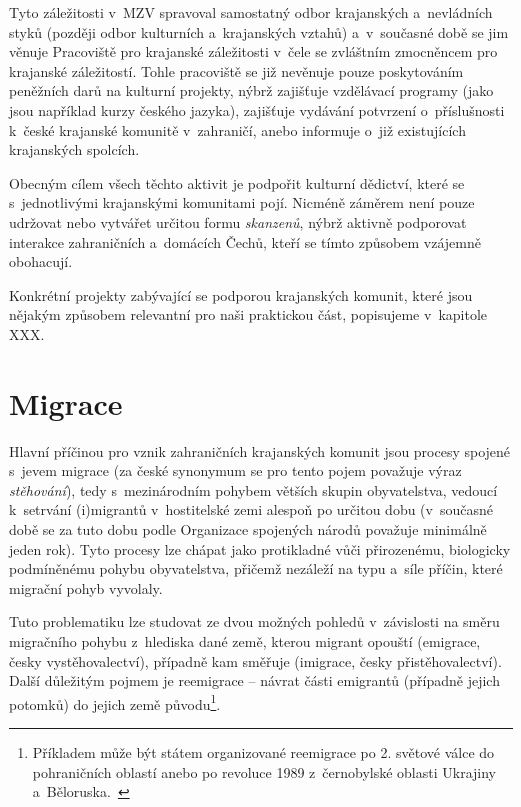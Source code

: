 Tyto záležitosti v~MZV spravoval samostatný odbor krajanských a~nevládních styků (později odbor kulturních a~krajanských vztahů) a~v~současné době se jim věnuje Pracoviště pro krajanské záležitosti v~čele se zvláštním zmocněncem pro krajanské záležitostí. Tohle pracoviště se již nevěnuje pouze poskytováním peněžních darů na kulturní projekty, nýbrž zajišťuje vzdělávací programy (jako jsou například kurzy českého jazyka), zajišťuje vydávání potvrzení o~příslušnosti k~české krajanské komunitě v~zahraničí, anebo informuje o~již existujících krajanských spolcích.~\parencite{Krajane-mv3}

Obecným cílem všech těchto aktivit je podpořit kulturní dědictví, které se s~jednotlivými krajanskými komunitami pojí. Nicméně záměrem není pouze udržovat nebo vytvářet určitou formu \emph{skanzenů}, nýbrž aktivně podporovat interakce zahraničních a~domácích Čechů, kteří se tímto způsobem vzájemně obohacují.~\parencite{Broucek2009}

Konkrétní projekty zabývající se podporou krajanských komunit, které jsou nějakým způsobem relevantní pro naši praktickou část, popisujeme v~kapitole XXX.

\hypertarget{migrace}{%
\section{Migrace}\label{migrace}}

Hlavní příčinou pro vznik zahraničních krajanských komunit jsou procesy spojené s~jevem migrace (za české synonymum se pro tento pojem považuje výraz \emph{stěhování}), tedy s~mezinárodním pohybem větších skupin obyvatelstva, vedoucí k~setrvání (i)migrantů v~hostitelské zemi alespoň po určitou dobu (v~současné době se za tuto dobu podle Organizace spojených národů považuje minimálně jeden rok). Tyto procesy lze chápat jako protikladné vůči přirozenému, biologicky podmíněnému pohybu obyvatelstva, přičemž nezáleží na typu a~síle příčin, které migrační pohyb vyvolaly.~\parencite{Nespor2005}

Tuto problematiku lze studovat ze dvou možných pohledů v~závislosti na směru migračního pohybu z~hlediska dané země, kterou migrant opouští (emigrace, česky vystěhovalectví), případně kam směřuje (imigrace, česky přistěhovalectví).~\parencite{Fialova2017b} Další důležitým pojmem je reemigrace -- návrat části emigrantů (případně jejich potomků) do jejich země původu\footnote{Příkladem může být státem organizované reemigrace po 2. světové válce do pohraničních oblastí anebo po revoluce 1989 z~černobylské oblasti Ukrajiny a~Běloruska.~\parencite{Vaculik2002}}.~\parencite{Nespor2005}

